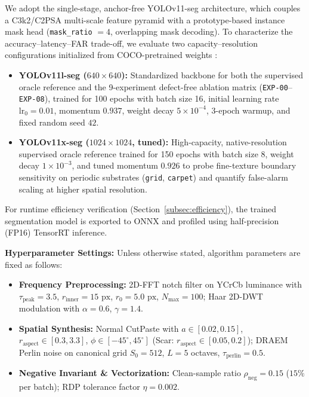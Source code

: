 We adopt the single-stage, anchor-free YOLOv11-seg architecture, which couples a C3k2/C2PSA multi-scale feature pyramid with a prototype-based instance mask head (\texttt{mask\_ratio} $= 4$, overlapping mask decoding). To characterize the accuracy--latency--FAR trade-off, we evaluate two capacity--resolution configurations initialized from COCO-pretrained weights \cite{lin2014microsoft}:
\begin{itemize}
    \item \textbf{YOLOv11l-seg ($640\times 640$):} Standardized backbone for both the supervised oracle reference and the 9-experiment defect-free ablation matrix (\texttt{EXP-00}--\texttt{EXP-08}), trained for 100 epochs with batch size 16, initial learning rate $\text{lr}_0 = 0.01$, momentum $0.937$, weight decay $5\times 10^{-4}$, 3-epoch warmup, and fixed random seed $42$.
    \item \textbf{YOLOv11x-seg ($1024\times 1024$, tuned):} High-capacity, native-resolution supervised oracle reference trained for 150 epochs with batch size 8, weight decay $1\times 10^{-3}$, and tuned momentum $0.926$ to probe fine-texture boundary sensitivity on periodic substrates (\texttt{grid}, \texttt{carpet}) and quantify false-alarm scaling at higher spatial resolution.
\end{itemize}
For runtime efficiency verification (Section~\ref{subsec:efficiency}), the trained segmentation model is exported to ONNX and profiled using half-precision (FP16) TensorRT inference.

\textbf{Hyperparameter Settings:} Unless otherwise stated, algorithm parameters are fixed as follows:
\begin{itemize}
    \item \textbf{Frequency Preprocessing:} 2D-FFT notch filter on YCrCb luminance with $\tau_{\text{peak}} = 3.5$, $r_{\text{inner}} = 15\text{ px}$, $r_0 = 5.0\text{ px}$, $N_{\max} = 100$; Haar 2D-DWT modulation with $\alpha = 0.6$, $\gamma = 1.4$.
    \item \textbf{Spatial Synthesis:} Normal CutPaste with $a \in [0.02, 0.15]$, $r_{\text{aspect}} \in [0.3, 3.3]$, $\phi \in [-45^\circ, 45^\circ]$ (Scar: $r_{\text{aspect}} \in [0.05, 0.2]$); DRAEM Perlin noise on canonical grid $S_0 = 512$, $L = 5$ octaves, $\tau_{\text{perlin}} = 0.5$.
    \item \textbf{Negative Invariant \& Vectorization:} Clean-sample ratio $\rho_{\text{neg}} = 0.15$ ($15\%$ per batch); RDP tolerance factor $\eta = 0.002$.
\end{itemize}

